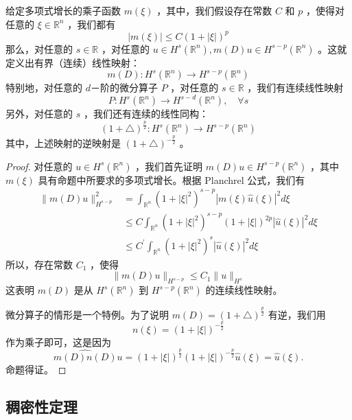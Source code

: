 \begin{proposition}
给定多项式增长的乘子函数 $m(\xi)$ ，其中，我们假设存在常数 $C$ 和 $p$ ，使得对任意的 $\xi \in \mathbb{R}^n$ ，我们都有
\[
|m(\xi)| \leqslant C(1+|\xi|)^p
\]那么，对任意的 $s \in \mathbb{R}$ ，对任意的 $u \in H^s\left(\mathbb{R}^n\right), m(D) u \in H^{s-p}\left(\mathbb{R}^n\right)$ 。这就定义出有界（连续）线性映射：
\[
m(D): H^s\left(\mathbb{R}^n\right) \rightarrow H^{s-p}\left(\mathbb{R}^n\right)
\]特别地，对任意的 $d$－阶的微分算子 $P$ ，对任意的 $s \in \mathbb{R}$ ，我们有连续线性映射
\[
P: H^s\left(\mathbb{R}^n\right) \rightarrow H^{s-d}\left(\mathbb{R}^n\right), \quad \forall s
\]另外，对任意的 $s$ ，我们还有连续的线性同构：
\[
(1+\triangle)^{\frac{p}{2}}: H^s\left(\mathbb{R}^n\right) \rightarrow H^{s-p}\left(\mathbb{R}^n\right)
\]其中，上述映射的逆映射是 $(1+\triangle)^{-\frac{p}{2}}$ 。\label{e86d38}
\end{proposition}

\begin{proof}
对任意的 $u \in H^s\left(\mathbb{R}^n\right)$ ，我们首先证明 $m(D) u \in H^{s-p}\left(\mathbb{R}^n\right)$ ，其中 $m(\xi)$ 具有命题中所要求的多项式增长。根据 Planchrel 公式，我们有
\[
\begin{aligned}
\|m(D) u\|_{H^{s-p}}^2 & =\int_{\mathbb{R}^n}\left(1+|\xi|^2\right)^{s-p}|m(\xi) \widehat{u}(\xi)|^2 d \xi \\
& \leqslant C \int_{\mathbb{R}^n}\left(1+|\xi|^2\right)^{s-p}(1+|\xi|)^{2 p}|\widehat{u}(\xi)|^2 d \xi \\
& \leqslant C^{\prime} \int_{\mathbb{R}^n}\left(1+|\xi|^2\right)^s|\widehat{u}(\xi)|^2 d \xi
\end{aligned}
\]
所以，存在常数 $C_1$ ，使得
\[
\|m(D) u\|_{H^{s-p}} \leqslant C_1\|u\|_{H^s}
\]
这表明 $m(D)$ 是从 $H^s\left(\mathbb{R}^n\right)$ 到 $H^{s-p}\left(\mathbb{R}^n\right)$ 的连续线性映射。

微分算子的情形是一个特例。为了说明 $m(D)=(1+\triangle)^{\frac{p}{2}}$ 有逆，我们用
\[
n(\xi)=(1+|\xi|)^{-\frac{p}{2}}
\]
作为乘子即可，这是因为
\[
\widehat{m(D) n(D)} u=(1+|\xi|)^{\frac{p}{2}}(1+|\xi|)^{-\frac{p}{2}} \widehat{u}(\xi)=\widehat{u}(\xi).
\]
命题得证。
\end{proof}

\subsection{稠密性定理}

